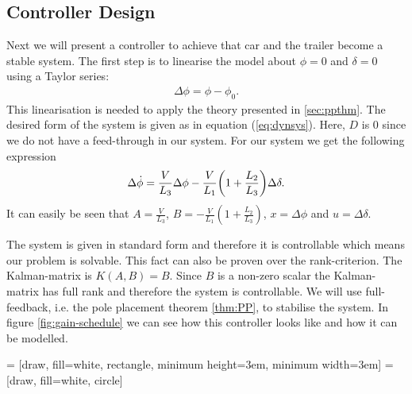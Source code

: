 \subsection{Controller Design}\label{sec:controllerdesign}

Next we will present a controller to achieve that car and the trailer become a stable system. The first step is to linearise the model about $\phi = 0$ and $\delta = 0$ using a Taylor series:
\begin{align*}
\Delta \phi = \phi - \phi_{0} .
\end{align*}
This linearisation is needed to apply the theory presented in \cref{sec:ppthm}. The desired form of the system is given as in equation (\ref{eq:dynsys}). Here, $D$ is 0 since we do not have a feed-through in our system. For our system we get the following expression
\begin{align}\label{eq:controler-system}
\Delta \dot{\phi} = \frac{V}{L_{3}} \Delta \phi - \frac{V}{L_{1}} \qty( 1 + \frac{L_{2}}{L_{3}} ) \Delta \delta .
\end{align}
It can easily be seen that $A=\frac{V}{L_3}$, $B = -\frac{V}{L_1}(1+\frac{L_2}{L_3})$, $x = \Delta\phi$ and $u=\Delta\delta$.

The system is given in standard form and therefore it is controllable which means our problem is solvable. This fact can also be proven over the rank-criterion. The Kalman-matrix is $K(A,B) = B$. Since $B$ is a non-zero scalar the Kalman-matrix has full rank and therefore the system is controllable. We will use full-feedback, i.e. the pole placement theorem \ref{thm:PP}, to stabilise the system. In figure \ref{fig:gain-schedule} we can see how this controller looks like and how it can be modelled.

 = [draw, fill=white, rectangle,
minimum height=3em, minimum width=3em]
 = [draw, fill=white, circle]

